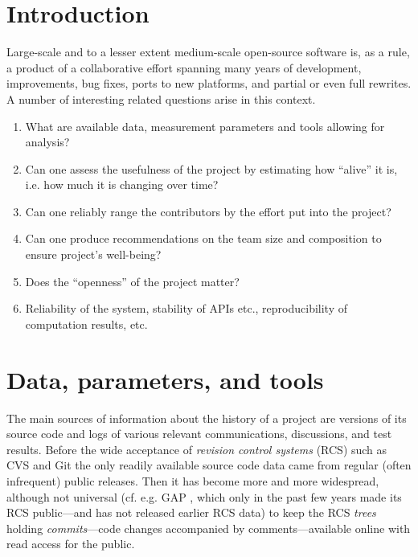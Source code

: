 \documentclass{deliverablereport}
\author{Dmitrii Pasechnik}
\begin{document}
\maketitle
%
\strut\githubissuedescription
\newpage\tableofcontents

\section{Introduction} 

Large-scale and to a lesser extent medium-scale open-source software 
is, as a rule, a product of a collaborative effort spanning many years of
development, improvements, bug fixes, ports to new platforms,
and partial or even full rewrites. A number of interesting related questions
arise in this context.
\begin{enumerate}
\item What are available data, measurement parameters and tools
allowing for analysis?
\item Can one assess the usefulness of the project by estimating
how ``alive'' it is, i.e. how much it is changing over time?
\item Can one reliably range the contributors
by the effort put into the project?
\item Can one produce recommendations on the team size and composition
to ensure project's well-being?
\item Does the ``openness'' of the project matter?
\item Reliability of the system, stability of APIs etc., 
reproducibility of computation results, etc.
\end{enumerate}

\section{Data, parameters, and tools}

The main sources of information about the history of a project are versions of
its source code and logs of various relevant communications, discussions, and
test results.  Before the wide acceptance of {\em revision control systems} 
(RCS) \cite{OSullivan:MakingSenseOfRCS} such as  CVS \cite{CVSWeb} and
Git \cite{ChaStr:pg14} the only readily available source code data came from
regular (often infrequent) public releases. Then it has become
more and more widespread, although not universal (cf. e.g. GAP \cite{gap},
which only in the past few years made its RCS 
public---and has not released earlier RCS data)
to keep the RCS {\em trees} holding {\em commits}---code changes
accompanied by comments---available online with read access for the public.
\end{document}
